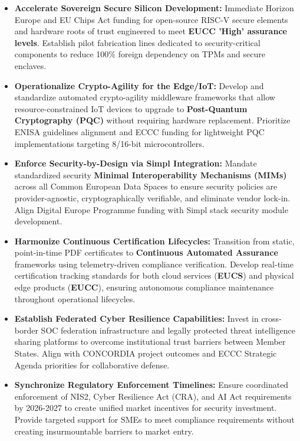 \documentclass{ieeeaccess}
\begin{document}
\begin{itemize}
    \item \textbf{Accelerate Sovereign Secure Silicon Development:} Immediate Horizon Europe and EU Chips Act funding for open-source RISC-V secure elements and hardware roots of trust engineered to meet \textbf{EUCC 'High' assurance levels}. Establish pilot fabrication lines dedicated to security-critical components to reduce 100\% foreign dependency on TPMs and secure enclaves.
    
    \item \textbf{Operationalize Crypto-Agility for the Edge/IoT:} Develop and standardize automated crypto-agility middleware frameworks that allow resource-constrained IoT devices to upgrade to \textbf{Post-Quantum Cryptography (PQC)} without requiring hardware replacement. Prioritize ENISA guidelines alignment and ECCC funding for lightweight PQC implementations targeting 8/16-bit microcontrollers.
    
    \item \textbf{Enforce Security-by-Design via Simpl Integration:} Mandate standardized security \textbf{Minimal Interoperability Mechanisms (MIMs)} across all Common European Data Spaces to ensure security policies are provider-agnostic, cryptographically verifiable, and eliminate vendor lock-in. Align Digital Europe Programme funding with Simpl stack security module development.
    
    \item \textbf{Harmonize Continuous Certification Lifecycles:} Transition from static, point-in-time PDF certificates to \textbf{Continuous Automated Assurance} frameworks using telemetry-driven compliance verification. Develop real-time certification tracking standards for both cloud services (\textbf{EUCS}) and physical edge products (\textbf{EUCC}), ensuring autonomous compliance maintenance throughout operational lifecycles.
    
    \item \textbf{Establish Federated Cyber Resilience Capabilities:} Invest in cross-border SOC federation infrastructure and legally protected threat intelligence sharing platforms to overcome institutional trust barriers between Member States. Align with CONCORDIA project outcomes and ECCC Strategic Agenda priorities for collaborative defense.
    
    \item \textbf{Synchronize Regulatory Enforcement Timelines:} Ensure coordinated enforcement of NIS2, Cyber Resilience Act (CRA), and AI Act requirements by 2026-2027 to create unified market incentives for security investment. Provide targeted support for SMEs to meet compliance requirements without creating insurmountable barriers to market entry.
\end{itemize}
\end{document}
